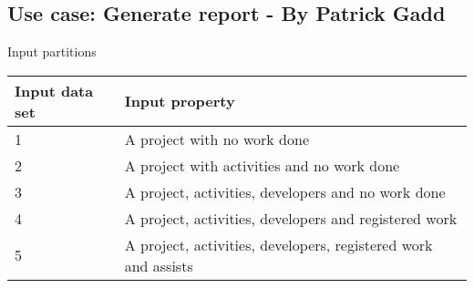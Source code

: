 \subsection{Use case: Generate report - By Patrick Gadd}


Input partitions
\begin{center}
  \begin{tabular}{| l | l |}
    \hline
	Input data set & Input property \\ \hline
    1 & A project with no work done \\ \hline
    2 & A project with activities and no work done \\ \hline
    3 & A project, activities, developers and no work done \\ \hline
	4 & A project, activities, developers and registered work \\ \hline
	5 & A project, activities, developers, registered work and assists \\
    \hline
  \end{tabular}
\end{center}


